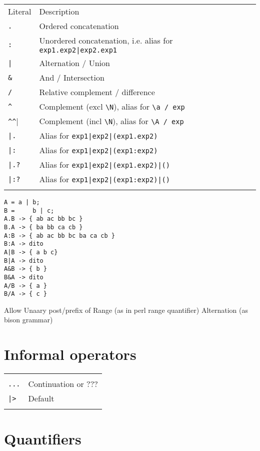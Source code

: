 \documentclass[a4paper]{report}
\begin{document}
\begin{tabular}{p{2cm}p{9.5cm}}
Literal  & Description \\
\verb|.| & Ordered concatenation \\ %
\verb|:| & Unordered concatenation, i.e. alias for \verb#exp1.exp2|exp2.exp1# \\
\verb+|+ & Alternation / Union \\
\verb|&| & And / Intersection \\
\verb|/| & Relative complement / difference \\
\verb|^| & Complement (excl \verb|\N|), alias for \verb|\a / exp| \\
\verb|^^| & Complement (incl \verb|\N|), alias for \verb|\A / exp| \\
\verb#|.# & Alias for \verb#exp1|exp2|(exp1.exp2)#\\
\verb#|:# & Alias for \verb#exp1|exp2|(exp1:exp2)#\\
\verb#|.?# & Alias for \verb#exp1|exp2|(exp1.exp2)|()#\\
\verb#|:?# & Alias for \verb#exp1|exp2|(exp1:exp2)|()#\\
 & \\
\end{tabular}

\begin{verbatim}
A = a | b; 
B =     b | c;
A.B -> { ab ac bb bc }
B.A -> { ba bb ca cb }
A:B -> { ab ac bb bc ba ca cb }
B:A -> dito
A|B -> { a b c}
B|A -> dito
A&B -> { b }
B&A -> dito
A/B -> { a }
B/A -> { c }
\end{verbatim}

Allow Unaary post/prefix of 
Range        (as in perl range quantifier)
Alternation  (as bison grammar)




\section{Informal operators}



\begin{tabular}{p{2cm}p{9.5cm}}
  & \\
\verb|...| & Continuation or ??? \\
\verb+|>+  & Default \\
  & \\
\end{tabular}


\section{Quantifiers}
\end{document}
